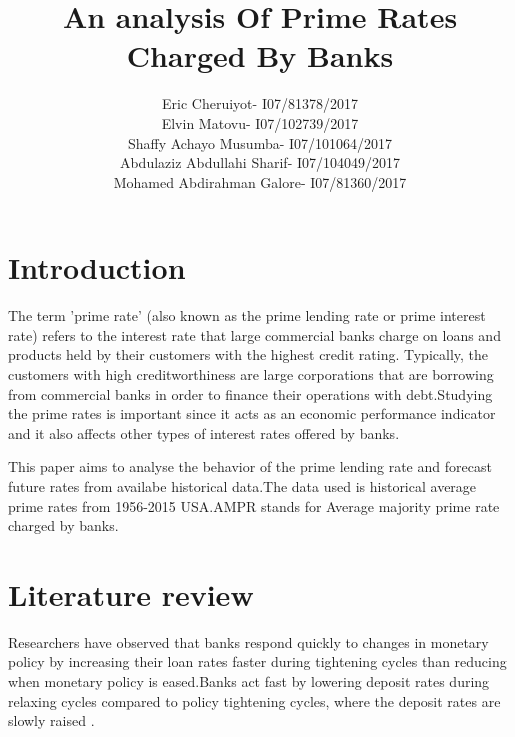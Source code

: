 \documentclass[12pt, a4paper]{report}\usepackage[]{graphicx}\usepackage[]{color}
\begin{document}
\setcounter{page}{1}
\setlength{\parindent}{0pt} 


\title{An analysis Of Prime Rates Charged By Banks}
\author{Eric Cheruiyot- I07/81378/2017\\

Elvin Matovu- I07/102739/2017\\

Shaffy Achayo Musumba- I07/101064/2017\\

Abdulaziz Abdullahi Sharif- I07/104049/2017\\

Mohamed Abdirahman Galore- I07/81360/2017\\}
\date{}
\vspace{5cm}
\maketitle
\newpage
\section{Introduction}
\setcounter{page}{1}
The term 'prime rate' (also known as the prime lending rate or prime interest rate) refers to the interest rate that large commercial banks charge on loans and products held by their customers with the highest credit rating. Typically, the customers with high creditworthiness are large corporations that are borrowing from commercial banks in order to finance their operations with debt.Studying the prime rates is important since it acts as an economic performance indicator and it also affects other types of interest rates offered by banks.

This paper aims to analyse the behavior of the prime lending rate and forecast future rates from availabe historical data.The data used is historical average prime rates from 1956-2015 USA.AMPR stands for Average majority prime rate charged by banks.
\section{Literature review}
Researchers have observed that banks respond quickly to changes in monetary policy by  increasing their loan rates  faster during tightening cycles than reducing when monetary policy is eased\citep{neumark1992market}.Banks act fast by lowering deposit rates during relaxing cycles compared to policy tightening cycles, where the deposit rates are slowly raised \citep{neumark1992market,hutchison1995retail}.
\end{document}
